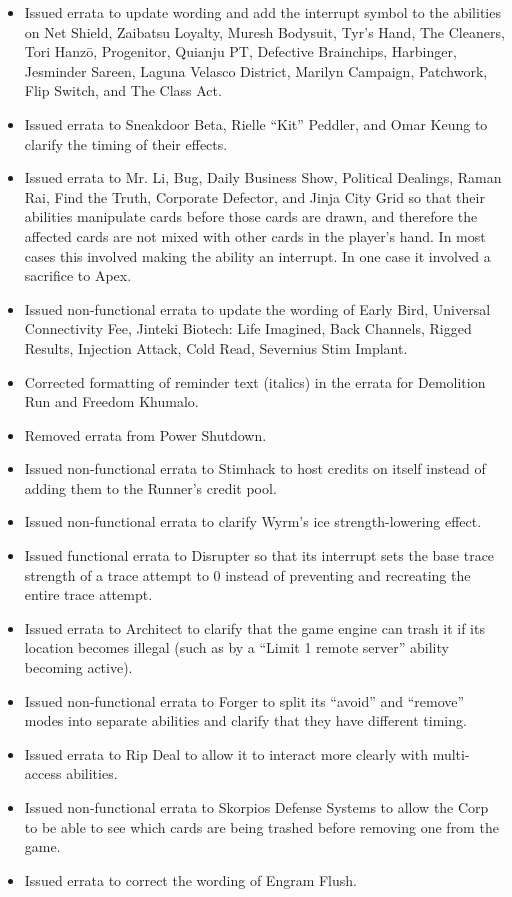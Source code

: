 \begin{titlepage}
\begin{itemize}
	\item Issued errata to update wording and add the interrupt symbol to the abilities on Net Shield, Zaibatsu	Loyalty, Muresh Bodysuit, Tyr's Hand, The Cleaners, Tori Hanzō, Progenitor, Quianju PT, Defective Brainchips, Harbinger, Jesminder Sareen, Laguna Velasco District, Marilyn Campaign, Patchwork, Flip	Switch, and The Class Act.
	\item Issued errata to Sneakdoor Beta, Rielle ``Kit'' Peddler, and Omar Keung to clarify the timing of their effects.
	\item Issued errata to Mr. Li, Bug, Daily Business Show, Political Dealings, Raman Rai, Find the Truth,	Corporate Defector, and Jinja City Grid so that their abilities manipulate cards before those cards are	drawn, and therefore the affected cards are not mixed with other cards in the player's hand. In most cases this involved making the ability an interrupt. In one case it involved a sacrifice to Apex.
	\item Issued non-functional errata to update the wording of Early Bird, Universal Connectivity Fee, Jinteki	Biotech: Life Imagined, Back Channels, Rigged Results, Injection Attack, Cold Read, Severnius Stim Implant.
	\item Corrected formatting of reminder text (italics) in the errata for Demolition Run and Freedom Khumalo.
	\item Removed errata from Power Shutdown.
	\item Issued non-functional errata to Stimhack to host credits on itself instead of adding them to the Runner's credit pool.
	\item Issued non-functional errata to clarify Wyrm's ice strength-lowering effect.
	\item Issued functional errata to Disrupter so that its interrupt sets the base trace strength of a trace attempt to 0 instead of preventing and recreating the entire trace attempt.
	\item Issued errata to Architect to clarify that the game engine can trash it if its location becomes illegal (such as by a ``Limit 1 remote server'' ability becoming active).
	\item Issued non-functional errata to Forger to split its ``avoid'' and ``remove'' modes into separate abilities and clarify that they have different timing.
	\item Issued errata to Rip Deal to allow it to interact more clearly with multi-access abilities.
	\item Issued non-functional errata to Skorpios Defense Systems to allow the Corp to be able to see which cards are being trashed before removing one from the game.
	\item Issued errata to correct the wording of Engram Flush.
	
\end{itemize}

\end{titlepage}